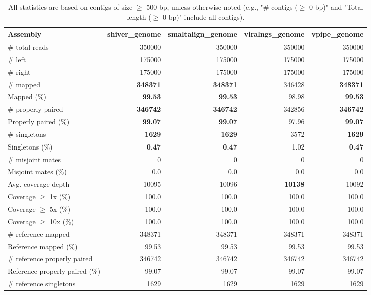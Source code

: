 \documentclass[12pt,a4paper]{article}
\begin{document}
\begin{table}[ht]
\begin{center}
\caption{All statistics are based on contigs of size $\geq$ 500 bp, unless otherwise noted (e.g., "\# contigs ($\geq$ 0 bp)" and "Total length ($\geq$ 0 bp)" include all contigs).}
\begin{tabular}{|l*{4}{|r}|}
\hline
Assembly & shiver\_genome & smaltalign\_genome & viralngs\_genome & vpipe\_genome \\ \hline
\# total reads & 350000 & 350000 & 350000 & 350000 \\ \hline
\# left & 175000 & 175000 & 175000 & 175000 \\ \hline
\# right & 175000 & 175000 & 175000 & 175000 \\ \hline
\# mapped & {\bf 348371} & {\bf 348371} & 346428 & {\bf 348371} \\ \hline
Mapped (\%) & {\bf 99.53} & {\bf 99.53} & 98.98 & {\bf 99.53} \\ \hline
\# properly paired & {\bf 346742} & {\bf 346742} & 342856 & {\bf 346742} \\ \hline
Properly paired (\%) & {\bf 99.07} & {\bf 99.07} & 97.96 & {\bf 99.07} \\ \hline
\# singletons & {\bf 1629} & {\bf 1629} & 3572 & {\bf 1629} \\ \hline
Singletons (\%) & {\bf 0.47} & {\bf 0.47} & 1.02 & {\bf 0.47} \\ \hline
\# misjoint mates & 0 & 0 & 0 & 0 \\ \hline
Misjoint mates (\%) & 0.0 & 0.0 & 0.0 & 0.0 \\ \hline
Avg. coverage depth & 10095 & 10096 & {\bf 10138} & 10092 \\ \hline
Coverage $\geq$ 1x (\%) & 100.0 & 100.0 & 100.0 & 100.0 \\ \hline
Coverage $\geq$ 5x (\%) & 100.0 & 100.0 & 100.0 & 100.0 \\ \hline
Coverage $\geq$ 10x (\%) & 100.0 & 100.0 & 100.0 & 100.0 \\ \hline
\# reference mapped & 348371 & 348371 & 348371 & 348371 \\ \hline
Reference mapped (\%) & 99.53 & 99.53 & 99.53 & 99.53 \\ \hline
\# reference properly paired & 346742 & 346742 & 346742 & 346742 \\ \hline
Reference properly paired (\%) & 99.07 & 99.07 & 99.07 & 99.07 \\ \hline
\# reference singletons & 1629 & 1629 & 1629 & 1629 \\ \hline

\end{tabular}
\end{center}
\end{table}
\end{document}
